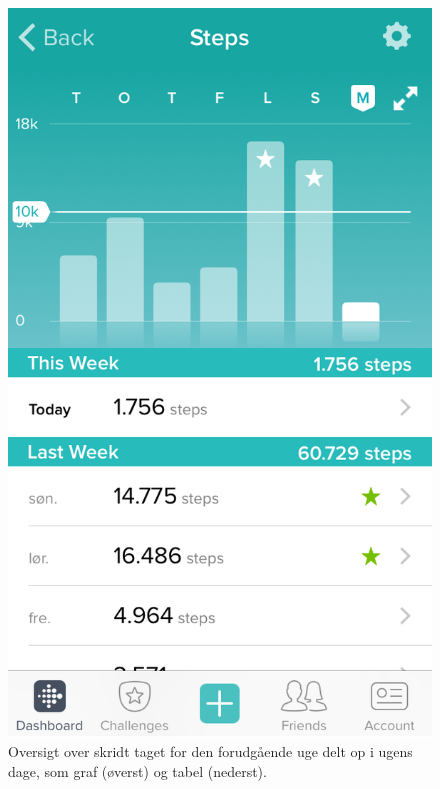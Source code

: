 \begin{figure}[H]
	\centering
	\begin{minipage}{0.48\textwidth}
		\centering
		\includegraphics[width=0.8\linewidth]{figures/brugerfladesteps}
		\caption{Oversigt over skridt taget for den  forudgående uge delt op i ugens dage, som graf (øverst) og tabel (nederst).}
		\label{fig:brugerfladesteps}
	\end{minipage}%
	\hspace{3mm}
	\begin{minipage}{0.48\textwidth}
		\centering		

\end{minipage}
\end{figure}
